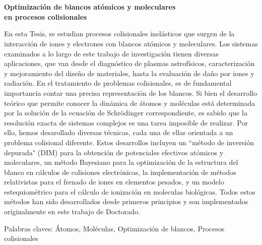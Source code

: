 \chapter*{}%
%

\begin{center}
\begin{large}
\textbf{Optimización de blancos atómicos y moleculares \\ en procesos colisionales}
\end{large}
\end{center}

\vspace{1.5cm}
En esta Tesis, se estudian procesos colisionales inelásticos que surgen 
de la interacción de iones y electrones con blancos atómicos y 
moleculares. Los sistemas examinados a lo largo de este trabajo de 
investigación tienen diversas aplicaciones, que van desde el diagnóstico 
de plasmas astrofísicos, caracterización y mejoramiento del diseño de 
materiales, hasta la evaluación de daño por iones y radiación. 
En el tratamiento de problemas colisionales, es de fundamental importancia 
contar una precisa representación de los blancos. Si bien el desarrollo 
teórico que permite conocer la dinámica de átomos y moléculas está 
determinada por la solución de la ecuación de Schr\"odinger 
correspondiente, es sabido que la resolución exacta de sistemas 
complejos es una tarea imposible de realizar. Por ello, hemos 
desarollado diversas técnicas, cada una de ellas orientada a un problema
colisional diferente. Estos desarrollos incluyen un ``método de inversión 
depurada" (DIM) para la obtención de potenciales efectivos atómicos y 
moleculares, un método Bayesiano para la optimización de la estructura 
del blanco en cálculos de colisiones electrónicas, la implementación 
de métodos relativistas para el frenado de iones en elementos pesados, 
y un modelo estequiométrico para el cálculo de ionización en moleculas 
biológicas.
Todos estos métodos han sido desarrollados desde primeros principios y
son implementados originalmente en este trabajo de Doctorado.



\vspace{1cm}
\noindent
Palabras claves:  
Átomos,
Moléculas,
Optimización de blancos,
Procesos colisionales
